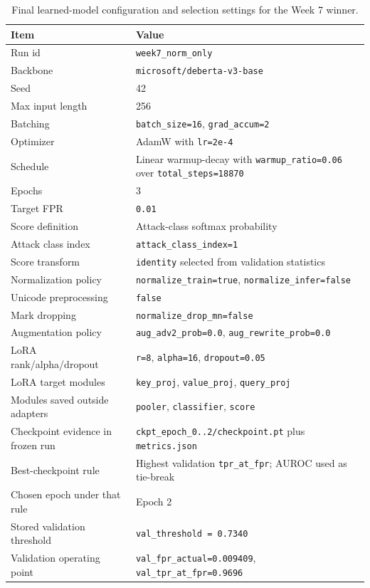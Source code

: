 \begin{table}[t]
\centering
\caption{Final learned-model configuration and selection settings for the Week 7 winner.}
\label{tab:week7_model_config}
\small
\begin{tabularx}{\textwidth}{>{\raggedright\arraybackslash}p{}X}
\toprule
Item & Value \\
\midrule
Run id & \texttt{week7\_norm\_only} \\
Backbone & \texttt{microsoft/deberta-v3-base} \\
Seed & 42 \\
Max input length & 256 \\
Batching & \texttt{batch\_size=16}, \texttt{grad\_accum=2} \\
Optimizer & AdamW with \texttt{lr=2e-4} \\
Schedule & Linear warmup-decay with \texttt{warmup\_ratio=0.06} over \texttt{total\_steps=18870} \\
Epochs & 3 \\
Target FPR & \texttt{0.01} \\
Score definition & Attack-class softmax probability \\
Attack class index & \texttt{attack\_class\_index=1} \\
Score transform & \texttt{identity} selected from validation statistics \\
Normalization policy & \texttt{normalize\_train=true}, \texttt{normalize\_infer=false} \\
Unicode preprocessing & \texttt{false} \\
Mark dropping & \texttt{normalize\_drop\_mn=false} \\
Augmentation policy & \texttt{aug\_adv2\_prob=0.0}, \texttt{aug\_rewrite\_prob=0.0} \\
LoRA rank/alpha/dropout & \texttt{r=8}, \texttt{alpha=16}, \texttt{dropout=0.05} \\
LoRA target modules & \texttt{key\_proj}, \texttt{value\_proj}, \texttt{query\_proj} \\
Modules saved outside adapters & \texttt{pooler}, \texttt{classifier}, \texttt{score} \\
Checkpoint evidence in frozen run & \texttt{ckpt\_epoch\_0..2/checkpoint.pt} plus \texttt{metrics.json} \\
Best-checkpoint rule & Highest validation \texttt{tpr\_at\_fpr}; AUROC used as tie-break \\
Chosen epoch under that rule & Epoch 2 \\
Stored validation threshold & \texttt{val\_threshold = 0.7340} \\
Validation operating point & \texttt{val\_fpr\_actual=0.009409}, \texttt{val\_tpr\_at\_fpr=0.9696} \\
\bottomrule
\end{tabularx}
\normalsize
\end{table}
